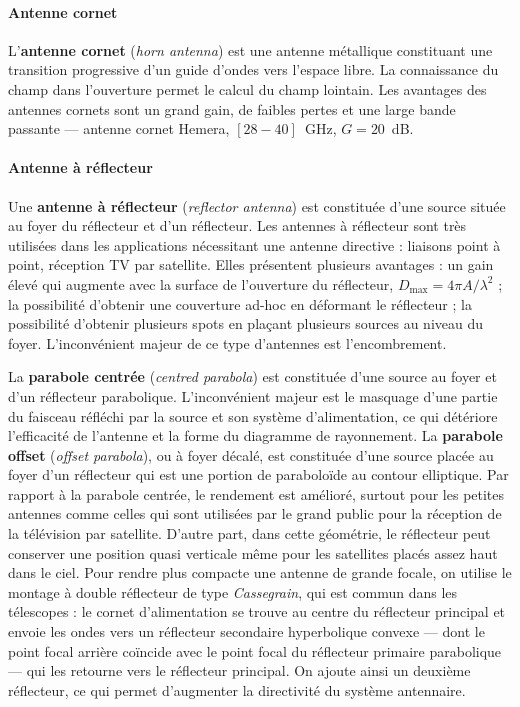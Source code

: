 \paragraph{Antenne cornet} L'\textbf{antenne cornet} (\textit{horn antenna})
est une antenne métallique constituant une transition progressive d'un guide
d'ondes vers l'espace libre. La connaissance du champ dans l'ouverture permet
le calcul du champ lointain. Les avantages des antennes cornets sont un grand
gain, de faibles pertes et une large bande passante --- antenne cornet Hemera,
$[28 - 40]$~GHz, $G = 20$~dB.

\paragraph{Antenne à réflecteur} Une \textbf{antenne à réflecteur}
(\textit{reflector antenna}) est constituée d'une source située au foyer du
réflecteur et d'un réflecteur. Les antennes à réflecteur sont très utilisées
dans les applications nécessitant une antenne directive : liaisons point à
point, réception TV par satellite. Elles présentent plusieurs avantages : un
gain élevé qui augmente avec la surface de l'ouverture du réflecteur,
$D_{\max} = 4\pi A/\lambda^2$ ; la possibilité d'obtenir une couverture ad-hoc
en déformant le réflecteur ; la possibilité d'obtenir plusieurs spots en
plaçant plusieurs sources au niveau du foyer. L'inconvénient majeur de ce type
d'antennes est l'encombrement.

La \textbf{parabole centrée} (\textit{centred parabola}) est constituée d'une
source au foyer et d'un réflecteur parabolique. L'inconvénient majeur est le
masquage d'une partie du faisceau réfléchi par la source et son système
d'alimentation, ce qui détériore l'efficacité de l'antenne et la forme du
diagramme de rayonnement. La \textbf{parabole offset}
(\textit{offset parabola}), ou à foyer décalé, est constituée d'une source
placée au foyer d'un réflecteur qui est une portion de paraboloïde au contour
elliptique. Par rapport à la parabole centrée, le rendement est amélioré,
surtout pour les petites antennes comme celles qui sont utilisées par le grand
public pour la réception de la télévision par satellite. D'autre part, dans
cette géométrie, le réflecteur peut conserver une position quasi verticale même
pour les satellites placés assez haut dans le ciel. Pour rendre plus compacte
une antenne de grande focale, on utilise le montage à double réflecteur de type
\emph{Cassegrain}, qui est commun dans les télescopes : le cornet
d'alimentation se trouve au centre du réflecteur principal et envoie les ondes
vers un réflecteur secondaire hyperbolique convexe --- dont le point focal
arrière coïncide avec le point focal du réflecteur primaire parabolique --- qui
les retourne vers le réflecteur principal. On ajoute ainsi un deuxième
réflecteur, ce qui permet d'augmenter la directivité du système antennaire.

